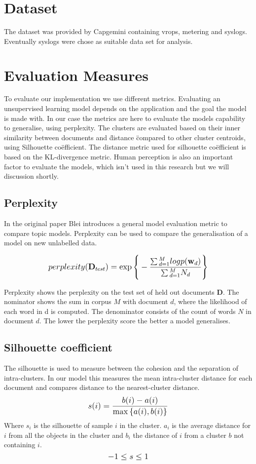 \section{Dataset}
The dataset was provided by Capgemini containing vrops, metering and syslogs. Eventually syslogs were chose as suitable data set for analysis. 

\section{Evaluation Measures}
To evaluate our implementation we use different metrics. Evaluating an unsupervised learning model depends on the application and the goal the model is made with. In our case the metrics are here to evaluate the models capability to generalise, using perplexity. The clusters are evaluated based on their inner similarity between documents and \" distance \" compared to other cluster centroids, using Silhouette co\"efficient. The distance metric used for silhouette co\"efficient is based on the KL-divergence metric. Human perception is also an important factor to evaluate the models, which isn't used in this research but we will discussion shortly.

\subsection{Perplexity}\label{research:perplexity}
In the original paper Blei introduces a general model evaluation metric \cite{Blei2003} to compare topic models. Perplexity can be used to compare the generalisation of a model on new unlabelled data.

\[
   \mathlarger{perplexity(\textbf{D}_{test}) = \exp{\Bigg \{ -\frac{\sum{}_{d=1}^{M}logp(\textbf{w}_d)}{\sum{}_{d=1}^{M}N_d} \Bigg \}}}
\]

Perplexity shows the perplexity on the test set of held out documents $\textbf{D}$. The nominator shows the sum in  corpus $M$ with document $d$, where the likelihood of each word in d is computed. The denominator consists of the count of words $N$ in document $d$.
The lower the perplexity score the better a model generalises. 


\subsection{Silhouette coefficient} \label{research:silhouette}
The silhouette is used to measure between the cohesion and the separation of intra-clusters. In our model this measures the mean intra-cluster distance for each document and compares distance to the nearest-cluster distance.
\[
   \mathlarger{s(i) = \frac{b(i) - a(i)}{\max{\{ a(i), b(i)}\} } }
\]
Where $s_i$ is the silhouette of sample $i$ in the cluster. $a_i$ is the average distance for $i$ from all the objects in the cluster and $b_i$ the distance of $i$ from a cluster $b$ not containing $i$. 
\[
\mathlarger{-1 \leq s \le 1}
\]

